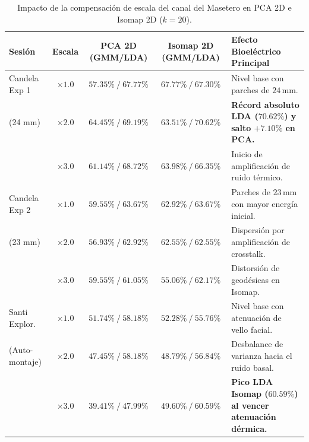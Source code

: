 \documentclass[11pt,a4paper]{article}
\begin{document}
\begin{table}[H]
\centering
\footnotesize
\begin{tabularx}{\textwidth}{p{2.2cm} c c c X}
\toprule
\textbf{Sesión} & \textbf{Escala} & \textbf{PCA 2D (GMM/LDA)} & \textbf{Isomap 2D (GMM/LDA)} & \textbf{Efecto Bioeléctrico Principal} \\
\midrule
Candela Exp 1 & $\times 1.0$ & $57.35\% \ / \ 67.77\%$ & $67.77\% \ / \ 67.30\%$ & Nivel base con parches de $24\,\text{mm}$. \\
(24 mm)      & $\mathbf{\times 2.0}$ & $\mathbf{64.45\%} \ / \ 69.19\%$ & $63.51\% \ / \ \mathbf{70.62\%}$ & \textbf{Récord absoluto LDA ($70.62\%$) y salto $+7.10\%$ en PCA.} \\
              & $\times 3.0$ & $61.14\% \ / \ 68.72\%$ & $63.98\% \ / \ 66.35\%$ & Inicio de amplificación de ruido térmico. \\
\midrule
Candela Exp 2 & $\times 1.0$ & $59.55\% \ / \ 63.67\%$ & $62.92\% \ / \ 63.67\%$ & Parches de $23\,\text{mm}$ con mayor energía inicial. \\
(23 mm)       & $\times 2.0$ & $56.93\% \ / \ 62.92\%$ & $62.55\% \ / \ 62.55\%$ & Dispersión por amplificación de crosstalk. \\
              & $\times 3.0$ & $59.55\% \ / \ 61.05\%$ & $55.06\% \ / \ 62.17\%$ & Distorsión de geodésicas en Isomap. \\
\midrule
Santi Explor. & $\times 1.0$ & $51.74\% \ / \ 58.18\%$ & $52.28\% \ / \ 55.76\%$ & Nivel base con atenuación de vello facial. \\
(Auto-montaje)& $\times 2.0$ & $47.45\% \ / \ 58.18\%$ & $48.79\% \ / \ 56.84\%$ & Desbalance de varianza hacia el ruido basal. \\
              & $\mathbf{\times 3.0}$ & $39.41\% \ / \ 47.99\%$ & $49.60\% \ / \ \mathbf{60.59\%}$ & \textbf{Pico LDA Isomap ($60.59\%$) al vencer atenuación dérmica.} \\
\bottomrule
\end{tabularx}
\caption{Impacto de la compensación de escala del canal del Masetero en PCA 2D e Isomap 2D ($k=20$).}
\label{tab:masetero_amplificado}
\end{table}
\end{document}
